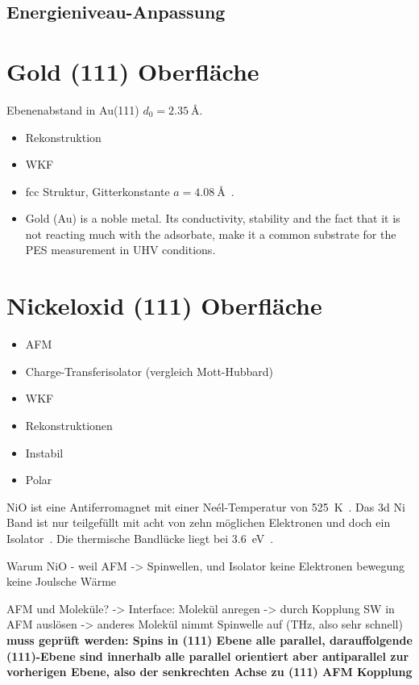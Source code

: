         \subsection{Energieniveau-Anpassung}


    \section{Gold (111) Oberfläche}
        \textbf{\cite{5A_1}}
        Ebenenabstand in Au(111) $d_0 = \SI{2.35}{\angstrom}$.

        \begin{itemize}
            \item Rekonstruktion
            \item WKF
            \item fcc Struktur, Gitterkonstante  $a=\SI{4.08}{\angstrom}$~\cite{Marx}.
            \item Gold (Au) is a noble metal. Its conductivity, stability and the fact that it is not reacting much with the adsorbate, make it a common substrate for the PES measurement in UHV conditions.
        \end{itemize}


    \section{Nickeloxid (111) Oberfläche}
        \begin{itemize}
            \item AFM
            \item Charge-Transferisolator (vergleich Mott-Hubbard)
            \item WKF
            \item Rekonstruktionen
            \item Instabil
            \item Polar
        \end{itemize}
        NiO ist eine Antiferromagnet mit einer Neél-Temperatur von \SI{525}{\kelvin}~\cite{kunz_chemisorption_1985}.
        Das 3d Ni Band ist nur teilgefüllt mit acht von zehn möglichen Elektronen und doch ein Isolator~\cite{kunz_chemisorption_1985}.
        Die thermische Bandlücke liegt bei \SI{3.6}{\electronvolt}~\cite{kunz_chemisorption_1985}.

        Warum NiO - weil AFM -> Spinwellen, und Isolator keine Elektronen bewegung keine Joulsche Wärme

        AFM und Moleküle? -> Interface: Molekül anregen -> durch Kopplung SW in AFM auslösen -> anderes Molekül nimmt Spinwelle auf (THz, also sehr schnell)
        \textbf{muss geprüft werden: Spins in (111) Ebene alle parallel, darauffolgende (111)-Ebene sind innerhalb alle parallel orientiert aber antiparallel zur vorherigen Ebene, also der senkrechten Achse zu (111) AFM Kopplung}

